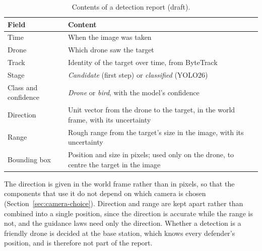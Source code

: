 \begin{table}[H]
\centering
\small
\begin{tabular}{|l|p{}|}
\hline
\textbf{Field} & \textbf{Content} \\
\hline
Time & When the image was taken \\
Drone & Which drone saw the target \\
Track & Identity of the target over time, from ByteTrack \\
Stage & \emph{Candidate} (first step) or \emph{classified} (YOLO26) \\
Class and confidence & \emph{Drone} or \emph{bird}, with the model's confidence \\
Direction & Unit vector from the drone to the target, in the world frame,
            with its uncertainty \\
Range & Rough range from the target's size in the image, with its
        uncertainty \\
Bounding box & Position and size in pixels; used only on the drone, to
               centre the target in the image \\
\hline
\end{tabular}
\caption{Contents of a detection report (draft).}
\label{tab:detection-report}
\end{table}

The direction is given in the world frame rather than in pixels, so that
the components that use it do not depend on which camera is chosen
(Section~\ref{sec:camera-choice}). Direction and range are kept apart
rather than combined into a single position, since the direction is
accurate while the range is not, and the guidance laws need only the
direction. Whether a detection is a friendly drone is decided at the base
station, which knows every defender's position, and is therefore not part
of the report.
